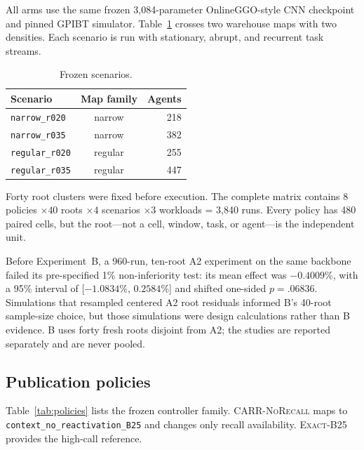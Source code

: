 \documentclass[sigconf,review,anonymous]{acmart}
\newcommand{\norecall}{\textsc{CARR-NoRecall}\xspace}
\newcommand{\exactdense}{\textsc{Exact-B25}\xspace}
\begin{document}
All arms use the same frozen 3,084-parameter OnlineGGO-style CNN checkpoint
and pinned GPIBT simulator. Table~\ref{tab:scenarios} crosses two warehouse
maps with two densities. Each scenario is run with stationary, abrupt, and
recurrent task streams.

\begin{table}[t]
\caption{Frozen scenarios.}
\label{tab:scenarios}
\centering
\small
\begin{tabular}{lcr}
\toprule
Scenario & Map family & Agents \\
\midrule
\texttt{narrow\_r020}  & narrow  & 218 \\
\texttt{narrow\_r035}  & narrow  & 382 \\
\texttt{regular\_r020} & regular & 255 \\
\texttt{regular\_r035} & regular & 447 \\
\bottomrule
\end{tabular}
\end{table}

Forty root clusters were fixed before execution. The complete matrix contains
$8$ policies $\times40$ roots $\times4$ scenarios $\times3$ workloads = 3{,}840
runs. Every policy has 480 paired cells, but the root---not a cell, window,
task, or agent---is the independent unit.

Before Experiment~B, a 960-run, ten-root A2 experiment on the same backbone
failed its pre-specified 1\% non-inferiority test: its mean effect was
$-0.4009\%$, with a 95\% interval of [$-1.0834\%$, $0.2584\%$] and shifted
one-sided $p=.06836$. Simulations that resampled centered A2 root residuals
informed B's 40-root sample-size choice, but those simulations were design
calculations rather than B evidence. B uses forty fresh roots disjoint from A2;
the studies are reported separately and are never pooled.

\subsection{Publication policies}

Table~\ref{tab:policies} lists the frozen controller family. \norecall maps to
\texttt{context\_no\_reactivation\_B25} and changes only recall availability.
\exactdense provides the high-call reference.
\end{document}
